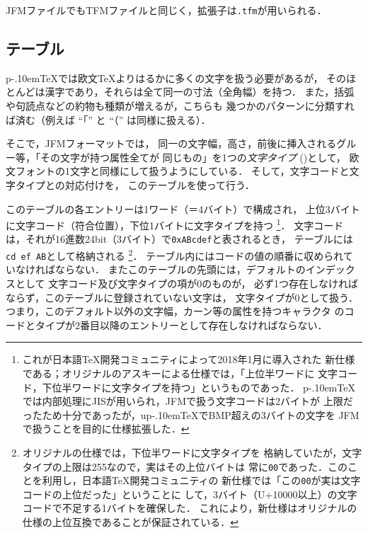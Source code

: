 \documentclass[a4paper,11pt,nomag]{jsarticle}
\def\code#1{\texttt{#1}}
\def\pTeX{p\kern-.10em\TeX}\def\upTeX{u\pTeX}
\begin{document}
JFMファイルでもTFMファイルと同じく，拡張子は\code{.tfm}が用いられる．

\subsection{テーブル}
\pTeX では欧文\TeX よりはるかに多くの文字を扱う必要があるが，
そのほとんどは漢字であり，それらは全て同一の寸法（全角幅）を持つ．
また，括弧や句読点などの約物も種類が増えるが，こちらも
幾つかのパターンに分類すれば済む（例えば ``「'' と ``（'' は同様に扱える）．

そこで，JFMフォーマットでは，
同一の文字幅，高さ，前後に挿入されるグルー等，「その文字が持つ属性全てが
同じもの」を1つの\emph{文字タイプ} ()として，
欧文フォントの1文字と同様にして扱うようにしている．
そして，文字コードと文字タイプとの対応付けを，
このテーブルを使って行う．

このテーブルの各エントリーは1ワード（＝4バイト）で構成され，
上位3バイトに文字コード（符合位置），下位1バイトに文字タイプを持つ
\footnote{これが日本語\TeX{}開発コミュニティによって2018年1月に導入された
新仕様である；オリジナルのアスキーによる仕様では，「上位半ワードに
文字コード，下位半ワードに文字タイプを持つ」というものであった．
\pTeX{}では内部処理にJISが用いられ，JFMで扱う文字コードは2バイトが
上限だったため十分であったが，\upTeX{}でBMP超えの3バイトの文字を
JFMで扱うことを目的に仕様拡張した．}．
文字コードは，それが16進数24bit（3バイト）で\code{0xABcdef}と表されるとき，
テーブルには\code{cd ef AB}として格納される
\footnote{オリジナルの仕様では，下位半ワードに文字タイプを
格納していたが，文字タイプの上限は255なので，実はその上位バイトは
常に\code{00}であった．このことを利用し，日本語\TeX{}開発コミュニティの
新仕様では「この\code{00}が実は文字コードの上位だった」ということに
して，3バイト（U+10000以上）の文字コードで不足する1バイトを確保した．
これにより，新仕様はオリジナルの仕様の上位互換であることが保証されている．}．
テーブル内にはコードの値の順番に収められていなければならない．
またこのテーブルの先頭には，デフォルトのインデックスとして
文字コード及び文字タイプの項が0のものが，
必ず1つ存在しなければならず，このテーブルに登録されていない文字は，
文字タイプが0として扱う．
つまり，このデフォルト以外の文字幅，カーン等の属性を持つキャラクタ
のコードとタイプが2番目以降のエントリーとして存在しなければならない．
\end{document}
